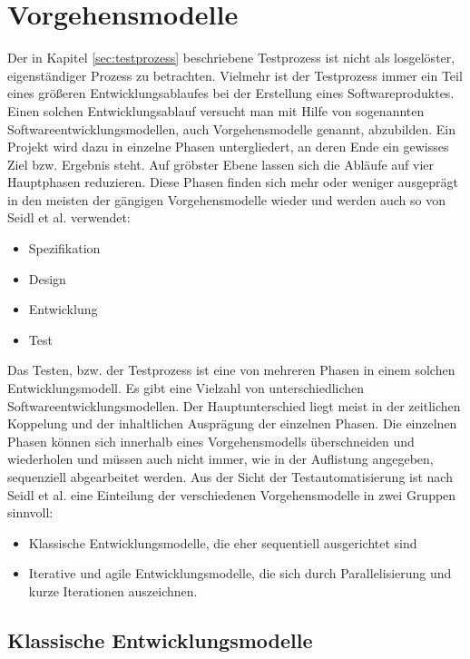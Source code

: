 \section{Vorgehensmodelle}
\label{sec:vorgehensmodelle}
Der in Kapitel \ref{sec:testprozess} beschriebene Testprozess ist nicht als losgelöster, eigenständiger Prozess zu betrachten. Vielmehr ist der Testprozess immer ein Teil eines größeren Entwicklungsablaufes bei der Erstellung eines Softwareproduktes. Einen solchen Entwicklungsablauf versucht man mit Hilfe von sogenannten Softwareentwicklungsmodellen, auch Vorgehensmodelle genannt, abzubilden.
Ein Projekt wird dazu in einzelne Phasen untergliedert, an deren Ende ein gewisses Ziel bzw. Ergebnis steht.
Auf gröbster Ebene lassen sich die Abläufe auf vier Hauptphasen reduzieren. Diese Phasen finden sich mehr oder weniger ausgeprägt in den meisten der gängigen Vorgehensmodelle wieder und werden auch so von Seidl et al. \cite[S.21 ff.]{seidl_basiswissen_2012} verwendet:

\begin{itemize}
\item Spezifikation
\item Design
\item Entwicklung
\item Test
\end{itemize}

Das Testen, bzw. der Testprozess ist eine von mehreren Phasen in einem solchen Entwicklungsmodell.
Es gibt eine Vielzahl von unterschiedlichen Softwareentwicklungsmodellen. Der Hauptunterschied liegt meist in der zeitlichen Koppelung und der inhaltlichen Ausprägung der einzelnen Phasen. Die einzelnen Phasen können sich innerhalb eines Vorgehensmodells überschneiden und wiederholen und müssen auch nicht immer, wie in der Auflistung angegeben, sequenziell abgearbeitet werden.
Aus der Sicht der Testautomatisierung ist nach Seidl et al. \cite[vgl. S.21 ff.]{seidl_basiswissen_2012} eine Einteilung der verschiedenen Vorgehensmodelle in zwei Gruppen sinnvoll: 

\begin{itemize}
\item Klassische Entwicklungsmodelle, die eher sequentiell ausgerichtet sind
\item Iterative und agile Entwicklungsmodelle, die sich durch Parallelisierung und kurze Iterationen auszeichnen.
\end{itemize}

\subsection{Klassische Entwicklungsmodelle}
\label{subsec:klassische_entwicklungsmodelle}


